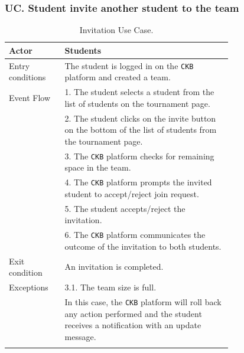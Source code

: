 \subsubsection*{UC\cuc . Student invite another student to the team}
\begin{center}
    \begin{longtable}{lp{0.75\linewidth}}
        \hline
        Actor            & Students                                                                                                                                                                               \\
        \hline
        Entry conditions & The student is logged in on the \verb|CKB| platform and created a team.                                                                                                               \\
        \hline
        Event Flow       
        & 1. The student selects a student from the list of students on the tournament page.\\
        & 2. The student clicks on the invite button on the bottom of the list of students from the tournament page.\\
        & 3. The \verb|CKB| platform checks for remaining space in the team.\\
        & 4. The \verb|CKB| platform prompts the invited student to accept/reject join request.\\
        & 5. The student accepts/reject the invitation. \\
        & 6. The \verb|CKB| platform communicates the outcome of the invitation to both students.\\
        \hline
        Exit condition   & An invitation is completed.   \\                                                                                                                                                                           
        \hline
        Exceptions   
        & 3.1. The team size is full.\\                                          
            & In this case, the \verb|CKB| platform will roll back any action performed and the student receives a notification with an update message.\\                                                               
        \hline
        \caption{Invitation Use Case.}
        \label{tab: invitation_use_case}
    \end{longtable}

\end{center}


